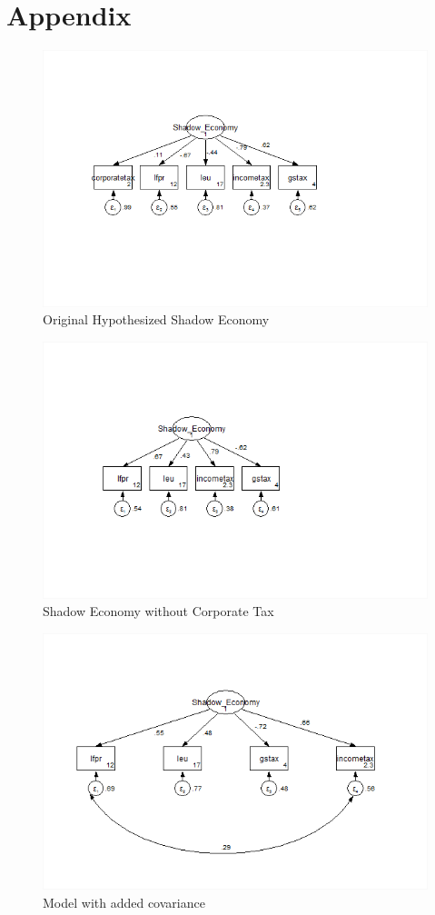 \documentclass[12pt]{report}
\begin{document}
\section*{Appendix}

\begin{figure}[htbp]
	\centering
	\includegraphics[width=0.7\linewidth]{"SEM_1"}
	\caption{Original Hypothesized Shadow Economy}
	\label{fig:model-1}
\end{figure}


\begin{figure}[htbp]
	\centering
	\includegraphics[width=0.7\linewidth]{"SEM_2"}
	\caption{Shadow Economy without Corporate Tax}
	\label{fig:model-2}
\end{figure}

\begin{figure}[htbp]
	\centering
	\includegraphics[width=0.7\linewidth]{"SEM_3"}
	\caption{Model with added covariance}
	\label{fig:model-3}
\end{figure}
\end{document}
